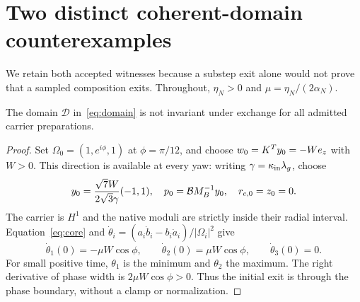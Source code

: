 \section{Two distinct coherent-domain counterexamples}\label{sec:domainfailures}
We retain both accepted witnesses because a substep exit alone would not prove that a sampled composition exits. Throughout, $\eta_N>0$ and $\mu=\eta_N/(2\alpha_N)$.

\begin{proposition}\label{prop:domainexchange}
The domain $\mathcal D$ in~\eqref{eq:domain} is not invariant under exchange for all admitted carrier preparations.
\end{proposition}
\begin{proof}
Set $\Omega_0=(1,e^{i\phi},1)$ at $\phi=\pi/12$, and choose $w_0=K^Ty_0=-We_z$ with $W>0$. This direction is available at every yaw: writing $\gamma=\kappa_{\rm in}\lambda_g$, choose
\begin{equation}\label{eq:boundaryprep}
 y_0=\frac{\sqrt7W}{2\sqrt3\gamma}(-1,1),\quad
 p_0=\mathcal B M_B^{-1}y_0,\quad r_{c,0}=z_0=0.
\end{equation}
The carrier is $H^1$ and the native moduli are strictly inside their radial interval. Equation~\eqref{eq:core} and $\dot\theta_i=(a_i\dot b_i-b_i\dot a_i)/|\Omega_i|^2$ give
\begin{equation}\label{eq:boundaryderivative}
 \dot\theta_1(0)=-\mu W\cos\phi,\qquad
 \dot\theta_2(0)=\mu W\cos\phi,\qquad \dot\theta_3(0)=0.
\end{equation}
For small positive time, $\theta_1$ is the minimum and $\theta_2$ the maximum. The right derivative of phase width is $2\mu W\cos\phi>0$. Thus the initial exit is through the phase boundary, without a clamp or normalization.
\end{proof}

